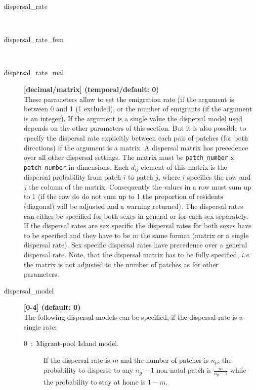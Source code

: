 \documentclass[letterpaper,12pt,oneside]{book}
\begin{document}
\begin{description}
\item[dispersal\_rate]\hspace*{\fill}\\
\vspace{-9mm}
\item[dispersal\_rate\_fem]\hspace*{\fill}\\
\vspace{-9mm}
\item[dispersal\_rate\_mal]\textbf{[decimal/matrix] (temporal/default: 0)}\\
These parameters allow to set the emigration rate (if the argument is between 0 and 1 (1 excluded), or the number of emigrants (if the argument is an integer). If the argument is a single value the dispersal model used depends on the other parameters of this section. But it is also possible to specify the dispersal rate explicitly between each pair of patches (for both directions) if the argument is a matrix. A dispersal matrix has precedence over all other dispersal settings. The matrix must be \texttt{patch\_number} x \texttt{patch\_number} in dimensions. Each $d_{ij}$ element of this matrix is the dispersal probability from patch $i$ to patch $j$, where $i$ specifies the row and $j$ the column of the matrix. Consequently the values in a row must sum up to 1 (if the row do do not sum up to 1 the proportion of residents (diagonal) will be adjusted and a warning returned). The dispersal rates can either be specified for both sexes in general or for each sex separately. If the dispersal rates are sex specific the dispersal rates for both sexes have to be specified and they have to be in the same format (matrix or a single dispersal rate). Sex specific dispersal rates have precedence over a general dispersal rate. Note, that the dispersal matrix has to be fully specified, \textit{i.e.} the matrix is not adjusted to the number of patches as for other parameters. 

\item[dispersal\_model] \textbf{[0-4] (default: 0)}\\
The following dispersal models can be specified, if the dispersal rate is a single rate:
\begin{description}
\item[0~:~Migrant-pool Island model.] If the dispersal rate is $m$ and the number of patches is $n_{p}$, the probability to disperse to any $n_{p}-1$ non-natal patch is $\frac{m}{n_{p}-1}$ while the probability to stay at home is $1-m$.


\end{description}
\end{description}
\end{document}
